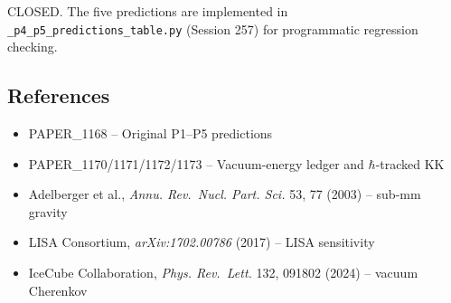 \documentclass[
]{article}
\providecommand{\tightlist}{%
  \setlength{\itemsep}{0pt}\setlength{\parskip}{0pt}}
\begin{document}
CLOSED. The five predictions are implemented in
\texttt{\_p4\_p5\_predictions\_table.py} (Session 257) for programmatic
regression checking.

\subsection{References}\label{references}

\begin{itemize}
\tightlist
\item
  PAPER\_1168 -- Original P1--P5 predictions
\item
  PAPER\_1170/1171/1172/1173 -- Vacuum-energy ledger and
  \(\hbar\)-tracked KK
\item
  Adelberger et al., \emph{Annu. Rev.~Nucl. Part. Sci.} 53, 77 (2003) --
  sub-mm gravity
\item
  LISA Consortium, \emph{arXiv:1702.00786} (2017) -- LISA sensitivity
\item
  IceCube Collaboration, \emph{Phys. Rev.~Lett.} 132, 091802 (2024) --
  vacuum Cherenkov
\end{itemize}




\end{document}
